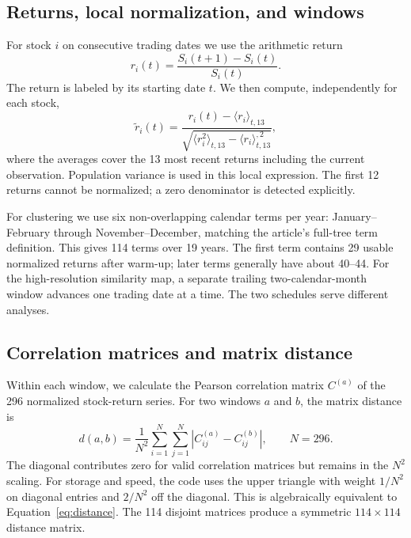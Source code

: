 \documentclass[11pt,a4paper]{article}
\begin{document}
\subsection{Returns, local normalization, and windows}
For stock $i$ on consecutive trading dates we use the arithmetic return
\begin{equation}r_i(t)=\frac{S_i(t+1)-S_i(t)}{S_i(t)}.\label{eq:return}\end{equation}
The return is labeled by its starting date $t$. We then compute, independently for each stock,
\begin{equation}
\widetilde r_i(t)=\frac{r_i(t)-\langle r_i\rangle_{t,13}}
{\sqrt{\langle r_i^2\rangle_{t,13}-\langle r_i\rangle_{t,13}^{,2}}},
\label{eq:normalize}\end{equation}
where the averages cover the 13 most recent returns including the current observation. Population variance is used in this local expression. The first 12 returns cannot be normalized; a zero denominator is detected explicitly.

For clustering we use six non-overlapping calendar terms per year: January--February through November--December, matching the article's full-tree term definition. This gives 114 terms over 19 years. The first term contains 29 usable normalized returns after warm-up; later terms generally have about 40--44. For the high-resolution similarity map, a separate trailing two-calendar-month window advances one trading date at a time. The two schedules serve different analyses.

\subsection{Correlation matrices and matrix distance}
Within each window, we calculate the Pearson correlation matrix $C^{(a)}$ of the 296 normalized stock-return series. For two windows $a$ and $b$, the matrix distance is
\begin{equation}
d(a,b)=\frac{1}{N^2}\sum_{i=1}^{N}\sum_{j=1}^{N}
\left|C_{ij}^{(a)}-C_{ij}^{(b)}\right|,\qquad N=296.
\label{eq:distance}\end{equation}
The diagonal contributes zero for valid correlation matrices but remains in the $N^2$ scaling. For storage and speed, the code uses the upper triangle with weight $1/N^2$ on diagonal entries and $2/N^2$ off the diagonal. This is algebraically equivalent to Equation~\eqref{eq:distance}. The 114 disjoint matrices produce a symmetric $114\times114$ distance matrix.
\end{document}
